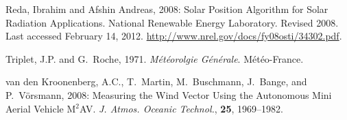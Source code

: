 \documentclass[a4paper,11pt]{report}
\begin{document}
\begin{thebibliography}{5}
 Reda, Ibrahim and Afshin Andreas, 2008: Solar Position Algorithm for Solar Radiation Applications. National Renewable Energy Laboratory. Revised 2008. Last accessed February 14, 2012. \href{http://www.nrel.gov/docs/fy08osti/34302.pdf}{http://www.nrel.gov/docs/fy08osti/34302.pdf}.

 Triplet, J.P. and G.~Roche, 1971. \emph{M\'et\'eorolgie G\'en\'erale}. M\'et\'eo-France.

 van den Kroonenberg, A.C., T.~Martin, M.~Buschmann, J.~Bange, and P.~V\"orsmann, 2008: Measuring the Wind Vector Using the Autonomous Mini Aerial Vehicle M$^2$AV. \emph{J. Atmos. Oceanic Technol.}, \textbf{25}, 1969--1982. 


\end{thebibliography}
\end{document}
